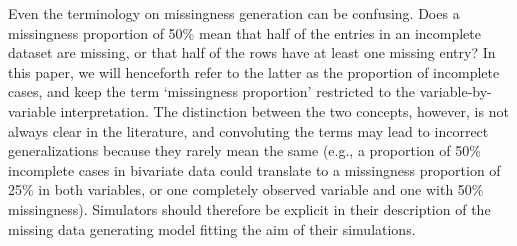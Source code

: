 \documentclass[bimj,fleqn]{w-art}
\begin{document}

Even the terminology on missingness generation can be confusing. Does a missingness proportion of 50\% mean that half of the entries in an incomplete dataset are missing, or that half of the rows have at least one missing entry? In this paper, we will henceforth refer to the latter as the proportion of incomplete cases, and keep the term `missingness proportion' restricted to the variable-by-variable interpretation. The distinction between the two concepts, however, is not always clear in the literature, and convoluting the terms may lead to incorrect generalizations because they rarely mean the same (e.g., a proportion of 50\% incomplete cases in bivariate data could translate to a missingness proportion of 25\% in both variables, or one completely observed variable and one with 50\% missingness). Simulators should therefore be explicit in their description of the missing data generating model fitting the aim of their simulations.
\end{document}
